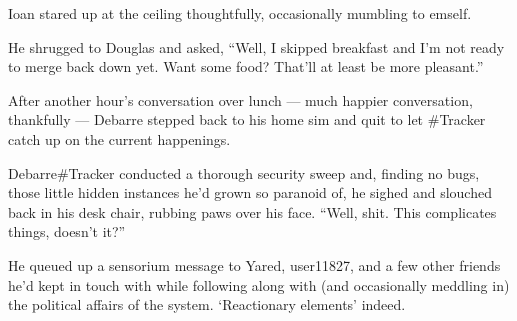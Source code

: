 Ioan stared up at the ceiling thoughtfully, occasionally mumbling to emself.

He shrugged to Douglas and asked, ``Well, I skipped breakfast and I'm not ready to merge back down yet. Want some food? That'll at least be more pleasant.''

After another hour's conversation over lunch — much happier conversation, thankfully — Debarre stepped back to his home sim and quit to let \#Tracker catch up on the current happenings.

Debarre\#Tracker conducted a thorough security sweep and, finding no bugs, those little hidden instances he'd grown so paranoid of, he sighed and slouched back in his desk chair, rubbing paws over his face. ``Well, shit. This complicates things, doesn't it?''

He queued up a sensorium message to Yared, user11827, and a few other friends he'd kept in touch with while following along with (and occasionally meddling in) the political affairs of the system. `Reactionary elements' indeed.
